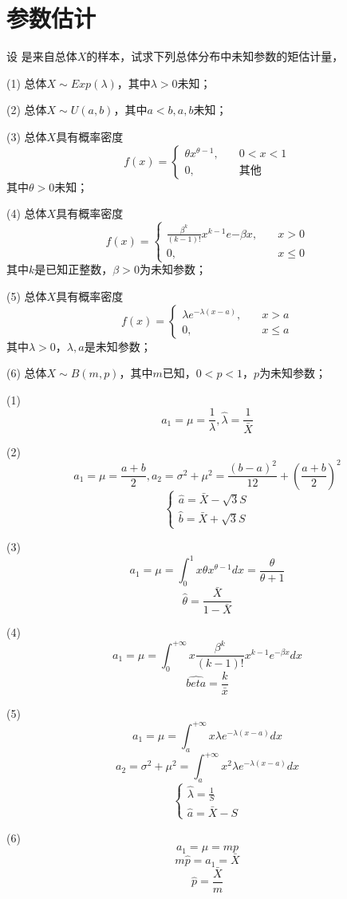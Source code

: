 \section{参数估计}

   设 \listXn 是来自总体$X$的样本，试求下列总体分布中未知参数的矩估计量，

  (1) 总体$X \sim Exp(\lambda)$，其中$\lambda > 0$未知；

  (2) 总体$X \sim U(a, b)$，其中$a<b, a,b$未知；

  (3) 总体$X$具有概率密度
  \[
    f(x) =
    \begin{cases}
      \theta x^{\theta - 1}, \quad &0< x <1\\
      0, \quad &\text{其他}
    \end{cases}
  \]
  其中$\theta > 0$未知；

  (4) 总体$X$具有概率密度
  \[
    f(x) =
    \begin{cases}
      \frac{\beta^k}{(k-1)!} x^{k-1} e{-\beta x}, \quad &x>0\\
      0, \quad &x\le 0
    \end{cases}
  \]
  其中$k$是已知正整数，$\beta >0$为未知参数；

  (5) 总体$X$具有概率密度
  \[
    f(x) =
    \begin{cases}
      \lambda e^{-\lambda (x-a)}, \quad &x>a\\
      0, \quad &x\le a
    \end{cases}
  \]
  其中$\lambda > 0$，$\lambda,a$是未知参数；

  (6) 总体$X \sim B(m, p)$，其中$m$已知，$0<p<1$，$p$为未知参数；

  \xsv
  (1) $$a_1 = \mu = \frac{1}{\lambda}, \hat{\lambda} = \frac{1}{\bar{X}}$$

  (2) $$a_1 = \mu = \frac{a+b}{2}, a_2 = \sigma^2 + \mu^2 = \frac{(b-a)^2}{12} + (\frac{a+b}{2})^2$$
  \[
    \begin{cases}
      \hat{a} = \bar{X} - \sqrt{3} S\\
      \hat{b} = \bar{X} + \sqrt{3} S
    \end{cases}
  \]

  (3) $$a_1 = \mu = \int_0^1 x \theta x^{\theta - 1}dx = \frac{\theta}{\theta + 1}$$
  $$\hat{\theta} = \frac{\bar{X}}{1-\bar{X}}$$

  (4) $$a_1 = \mu = \int_0^{+\infty} x \frac{\beta^k}{(k-1)!} x^{k-1} e^{-\beta x} dx$$
  $$\hat{beta} = \frac{k}{\bar{x}}$$

  (5) $$a_1 = \mu = \int_a^{+\infty} x \lambda e^{-\lambda (x-a)} dx$$
  $$a_2 = \sigma^2 + \mu^2 = \int_a^{+\infty} x^2 \lambda e^{-\lambda (x-a)} dx$$
  \[
    \begin{cases}
      \hat{\lambda} = \frac{1}{S}\\
      \hat{a} = \bar{X} - S
    \end{cases}
  \]

  (6) $$ a_1 = \mu = mp $$
  $$m\hat{p} = a_1 = \bar{X}$$
  $$\hat{p} = \frac{\bar{X}}{m}$$

  

